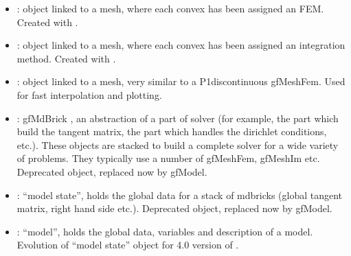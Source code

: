 \documentclass[a4paper,11pt,english]{sphinxmanual}
\begin{document}
\begin{itemize}
\item {} 
\sphinxAtStartPar
{} : object linked to a mesh, where each convex has been assigned
an FEM. Created with .

\item {} 
\sphinxAtStartPar
{} : object linked to a mesh, where each convex has been assigned
an integration method. Created with .

\item {} 
\sphinxAtStartPar
{} : object linked to a mesh, very similar to a
P1\sphinxhyphen{}discontinuous gfMeshFem. Used for fast interpolation and plotting.

\item {} 
\sphinxAtStartPar
{} : gfMdBrick , an abstraction of a part of solver (for
example, the part which build the tangent matrix, the part which handles the
dirichlet conditions, etc.). These objects are stacked to build a complete
solver for a wide variety of problems. They typically use a number of
gfMeshFem, gfMeshIm etc. Deprecated object, replaced now by gfModel.

\item {} 
\sphinxAtStartPar
{} : “model state”, holds the global data for a stack of mdbricks
(global tangent matrix, right hand side etc.). Deprecated object, replaced now by gfModel.

\item {} 
\sphinxAtStartPar
{} : “model”, holds the global data, variables and description of a
model. Evolution of “model state” object for 4.0 version of .

\end{itemize}
\end{document}
